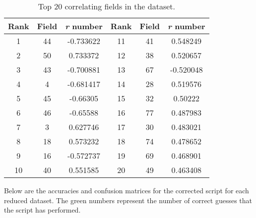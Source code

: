 \documentclass[a4paper,10pt]{article}
\begin{document}
    \begin{table}[ht!] 
        \centering
        \caption{Top 20 correlating fields in the dataset.}
        \begin{tabular}{|c|c|c||c|c|c|}
          \hline
          \textbf{Rank} & \textbf{Field} & \textbf{\textit{r} number} &\textbf{Rank} & \textbf{Field} & \textbf{\textit{r} number} \\  
           \hline
           1 & 44  &-0.733622 & 11 & 41 & 0.548249   \\
           2 & 50  & 0.733372 & 12 & 38 & 0.520657   \\
           3 & 43  &-0.700881 & 13 & 67 & -0.520048  \\
           4 & 4   & -0.681417& 14 & 28 &  0.519576  \\
           5 & 45  &-0.66305  & 15 & 32 & 0.50222    \\
           6 & 46  &-0.65588  & 16 & 77 & 0.487983   \\
           7 & 3   &0.627746  & 17 & 30 & 0.483021   \\
           8 & 18  & 0.573232 & 18 & 74 & 0.478652   \\
           9 & 16  &-0.572737 & 19 & 69 & 0.468901   \\
           10& 40  &0.551585  & 20 & 49 & 0.463408   \\
          \hline
        \end{tabular}
      \end{table}


    Below are the accuracies and confusion matrices for the corrected script for each reduced dataset.
    The green numbers represent the number of correct guesses that the script has performed.  
\end{document}
